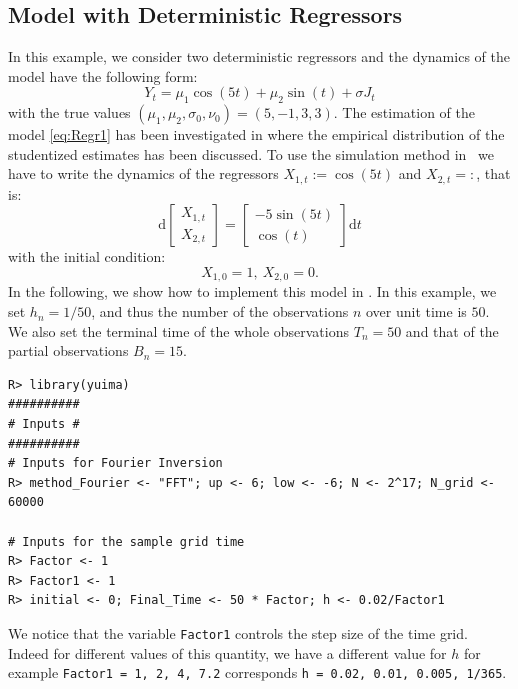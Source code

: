 \subsection{Model with Deterministic Regressors}\label{sec-deterministic}

In this example, we consider two deterministic regressors and the dynamics of the model have the following form:
\begin{equation}
Y_t =\mu_1 \cos\left(5t\right)+\mu_2 \sin\left(t\right) +\sigma J_t
\label{eq:Regr1}
\end{equation}
with the true values \(\left(\mu_1, \mu_2, \sigma_0, \nu_0\right)=\left(5,-1,3,3\right)\). The estimation of the model \eqref{eq:Regr1} has been investigated in \cite{masuda2023quasilikelihood} where the empirical distribution of the studentized estimates has been discussed.
To use the simulation method in  ~we have to write the dynamics of the regressors \(X_{1,t}:=\cos\left(5t\right)\) and \(X_{2,t}=:\), that is:
\begin{equation}
\mbox{d}\left[\begin{array}{c}
X_{1,t}\\
X_{2,t}
\end{array}
\right]=\left[\begin{array}{c}-5\sin\left(5t\right)\\
\cos\left(t\right)\end{array}\right]\mbox{d}t
\label{eq:reg1}
\end{equation}
with the initial condition:
\[
X_{1,0}=1, \ X_{2,0}=0.
\]
In the following, we show how to implement this model in .
In this example, we set \(h_n=1/50\), and thus the number of the observations \(n\) over unit time is \(50\). We also set the terminal time of the whole observations \(T_n=50\) and that of the partial observations \(B_n=15\).

\begin{verbatim}
R> library(yuima)
##########
# Inputs #
##########
# Inputs for Fourier Inversion
R> method_Fourier <- "FFT"; up <- 6; low <- -6; N <- 2^17; N_grid <- 60000

# Inputs for the sample grid time
R> Factor <- 1
R> Factor1 <- 1
R> initial <- 0; Final_Time <- 50 * Factor; h <- 0.02/Factor1
\end{verbatim}

We notice that the variable \texttt{Factor1} controls the step size of the time grid. Indeed for different values of this quantity, we have a different value for \(h\) for example \texttt{Factor1\ =\ 1,\ 2,\ 4,\ 7.2} corresponds \texttt{h\ =\ 0.02,\ 0.01,\ 0.005,\ 1/365}.

